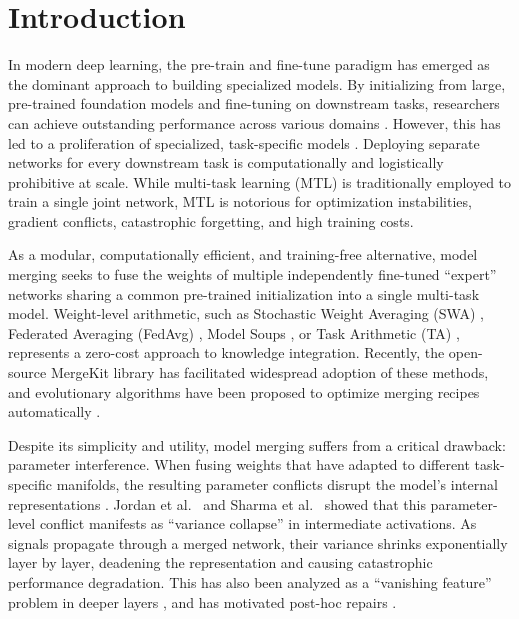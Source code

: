\documentclass{article}
\theoremstyle{plain}
\theoremstyle{definition}
\theoremstyle{remark}
\begin{document}
\section{Introduction}
\label{sec:intro}

In modern deep learning, the pre-train and fine-tune paradigm has emerged as the dominant approach to building specialized models. By initializing from large, pre-trained foundation models and fine-tuning on downstream tasks, researchers can achieve outstanding performance across various domains \cite{resnet, imagenet, adamw}. However, this has led to a proliferation of specialized, task-specific models \cite{cifar10, fmnist}. Deploying separate networks for every downstream task is computationally and logistically prohibitive at scale. While multi-task learning (MTL) is traditionally employed to train a single joint network, MTL is notorious for optimization instabilities, gradient conflicts, catastrophic forgetting, and high training costs.

As a modular, computationally efficient, and training-free alternative, model merging \cite{song2026model, yang2024model} seeks to fuse the weights of multiple independently fine-tuned ``expert'' networks sharing a common pre-trained initialization into a single multi-task model. Weight-level arithmetic, such as Stochastic Weight Averaging (SWA) \cite{swa}, Federated Averaging (FedAvg) \cite{fedavg}, Model Soups \cite{soups}, or Task Arithmetic (TA) \cite{task_arithmetic}, represents a zero-cost approach to knowledge integration. Recently, the open-source MergeKit library \cite{mergekit} has facilitated widespread adoption of these methods, and evolutionary algorithms have been proposed to optimize merging recipes automatically \cite{akiba2024evolutionary}.

Despite its simplicity and utility, model merging suffers from a critical drawback: parameter interference. When fusing weights that have adapted to different task-specific manifolds, the resulting parameter conflicts disrupt the model's internal representations \cite{model_recombination_entezari}. Jordan et al.\ \cite{repair} and Sharma et al.\ \cite{tact} showed that this parameter-level conflict manifests as ``variance collapse'' in intermediate activations. As signals propagate through a merged network, their variance shrinks exponentially layer by layer, deadening the representation and causing catastrophic performance degradation. This has also been analyzed as a ``vanishing feature'' problem in deeper layers \cite{vanishing_feature2025}, and has motivated post-hoc repairs \cite{adaptive_signal_repair2026}.
\end{document}
